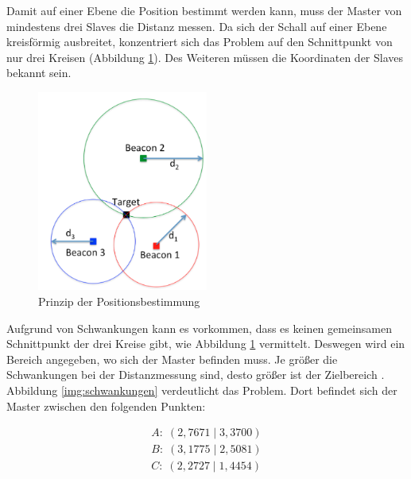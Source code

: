 Damit auf einer Ebene die Position bestimmt werden kann, muss der Master von mindestens drei Slaves die Distanz messen. Da sich der Schall auf einer Ebene kreisförmig ausbreitet, konzentriert sich das Problem auf den Schnittpunkt von nur drei Kreisen (Abbildung \ref{img:positionsbestimmung}). Des Weiteren müssen die Koordinaten der Slaves bekannt sein.
\begin{figure}[H]
\centering
\includegraphics[width=0.5\textwidth]{images/positionsbestimmung.png}
\caption{Prinzip der Positionsbestimmung}
\label{img:positionsbestimmung}
\end{figure}
Aufgrund von Schwankungen kann es vorkommen, dass es keinen gemeinsamen Schnittpunkt der drei Kreise gibt, wie Abbildung \ref{img:positionsbestimmung} vermittelt. Deswegen wird ein Bereich angegeben, wo sich der Master befinden muss. Je größer die Schwankungen bei der Distanzmessung sind, desto größer ist der Zielbereich \cite{src_MATH_TDOA}. Abbildung \ref{img:schwankungen} verdeutlicht das Problem. Dort befindet sich der Master zwischen den folgenden Punkten:

\begin{equation}
\begin{split}
A: \; (2,7671\;|\;3,3700) \\
B: \; (3,1775\;|\;2,5081) \\
C: \; (2,2727\;|\;1,4454)
\end{split}
\end{equation}

